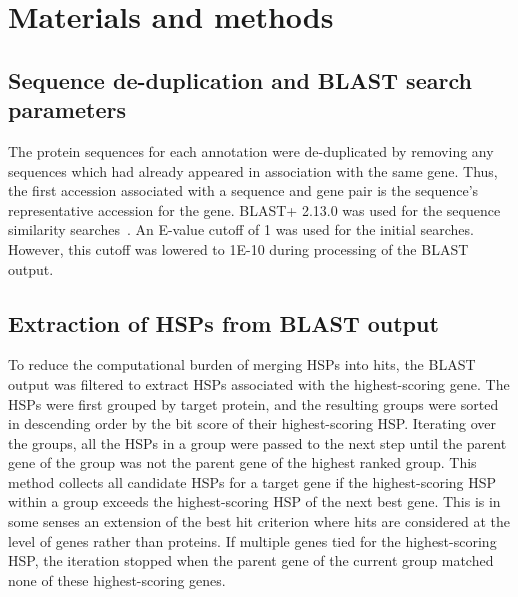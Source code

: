\section*{Materials and methods}
\subsection*{Sequence de-duplication and BLAST search parameters}
The protein sequences for each annotation were de-duplicated by removing any sequences which had already appeared in association with the same gene. Thus, the first accession associated with a sequence and gene pair is the sequence’s representative accession for the gene. BLAST+ 2.13.0 was used for the sequence similarity searches~\cite{Camacho2009}. An E-value cutoff of 1 was used for the initial searches. However, this cutoff was lowered to 1E-10 during processing of the BLAST output.

\subsection*{Extraction of HSPs from BLAST output}
To reduce the computational burden of merging HSPs into hits, the BLAST output was filtered to extract HSPs associated with the highest-scoring gene. The HSPs were first grouped by target protein, and the resulting groups were sorted in descending order by the bit score of their highest-scoring HSP. Iterating over the groups, all the HSPs in a group were passed to the next step until the parent gene of the group was not the parent gene of the highest ranked group. This method collects all candidate HSPs for a target gene if the highest-scoring HSP within a group exceeds the highest-scoring HSP of the next best gene. This is in some senses an extension of the best hit criterion where hits are considered at the level of genes rather than proteins. If multiple genes tied for the highest-scoring HSP, the iteration stopped when the parent gene of the current group matched none of these highest-scoring genes.

